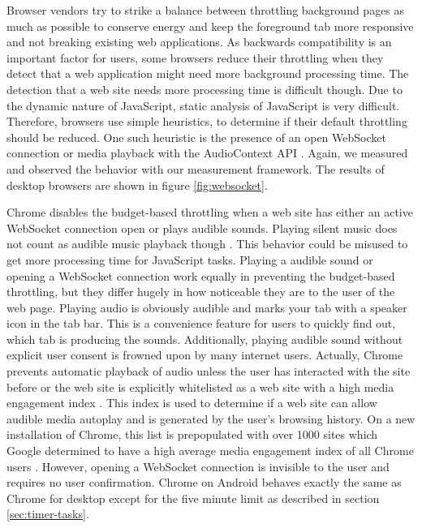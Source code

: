 \documentclass[
	ruledheaders=section,%
	class=report,%
	thesis={type=bachelor},%
	accentcolor=9c,%
	custommargins=true,%
	marginpar=false,%
	parskip=half-,%
	fontsize=11pt,%
]{tudapub}
\begin{document}
  Browser vendors try to strike a balance between throttling background pages as much as possible to conserve energy and keep the foreground tab more responsive and not breaking existing web applications. As backwards compatibility is an important factor for users, some browsers reduce their throttling when they detect that a web application might need more background processing time. The detection that a web site needs more processing time is difficult though. Due to the dynamic nature of JavaScript, static analysis of JavaScript is very difficult. Therefore, browsers use simple heuristics, to determine if their default throttling should be reduced. One such heuristic is the presence of an open WebSocket connection \cite{mdn-websocket} or media playback with the AudioContext API \cite{mdn-audiocontext}. Again, we measured and observed the behavior with our measurement framework. The results of desktop browsers are shown in figure \ref{fig:websocket}.

  Chrome disables the budget-based throttling when a web site has either an active WebSocket connection open or plays audible sounds. Playing silent music does not count as audible music playback though \cite{chrome-background-tabs}. This behavior could be misused to get more processing time for JavaScript tasks. Playing a audible sound or opening a WebSocket connection work equally in preventing the budget-based throttling, but they differ hugely in how noticeable they are to the user of the web page. Playing audio is obviously audible and marks your tab with a speaker icon in the tab bar. This is a convenience feature for users to quickly find out, which tab is producing the sounds. Additionally, playing audible sound without explicit user consent is frowned upon by many internet users. Actually, Chrome prevents automatic playback of audio unless the user has interacted with the site before or the web site is explicitly whitelisted as a web site with a high media engagement index \cite{chrome-media-engagement-index}. This index is used to determine if a web site can allow audible media autoplay and is generated by the user's browsing history. On a new installation of Chrome, this list is prepopulated with over 1000 sites which Google determined to have a high average media engagement index of all Chrome users \cite{chrome-autoplay}. However, opening a WebSocket connection is invisible to the user and requires no user confirmation. Chrome on Android behaves exactly the same as Chrome for desktop except for the five minute limit as described in section \ref{sec:timer-tasks}.
\end{document}
